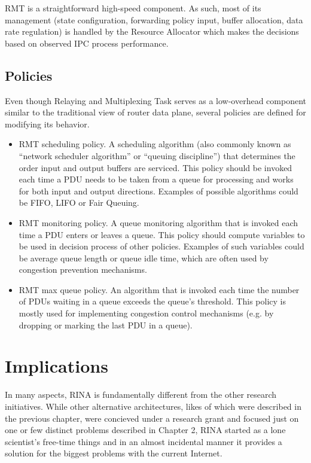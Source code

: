             RMT is a straightforward high-speed component. As such, most of its management (state configuration, forwarding policy input, buffer allocation, data rate regulation) is handled by the Resource Allocator which makes the decisions based on observed IPC process performance.


        \subsection{Policies}
            Even though Relaying and Multiplexing Task serves as a low-overhead component similar to the traditional view of router data plane, several policies are defined for modifying its behavior.

            \begin{itemize}
                \item RMT scheduling policy. A scheduling algorithm (also commonly known as ``network scheduler algorithm'' or ``queuing discipline'') that determines the order input and output buffers are serviced. This policy should be invoked each time a PDU needs to be taken from a queue for processing and works for both input and output directions. Examples of possible algorithms could be FIFO, LIFO or Fair Queuing.
                \item RMT monitoring policy. A queue monitoring algorithm that is invoked each time a PDU enters or leaves a queue. This policy should compute variables to be used in decision process of other policies. Examples of such variables could be average queue length or queue idle time, which are often used by congestion prevention mechanisms.
                \item RMT max queue policy. An algorithm that is invoked each time the number of PDUs waiting in a queue exceeds the queue's threshold. This policy is mostly used for implementing congestion control mechanisms (e.g. by dropping or marking the last PDU in a queue).
            \end{itemize}


    \section{Implications}
        In many aspects, RINA is fundamentally different from the other research initiatives. While other alternative architectures, likes of which were described in the previous chapter, were concieved under a research grant and focused just on one or few distinct problems described in Chapter 2, RINA started as a lone scientist's free-time things and in an almost incidental manner it provides a solution for the biggest problems with the current Internet.


